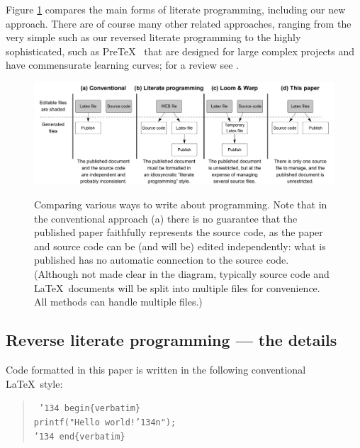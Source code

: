 \documentclass[12pt]{article}
\def\mycaption#1{\sf\bfseries\caption{\sf #1}}
\begin{document}

Figure \ref{fig:lp} compares the main forms of literate programming, including our new approach. There are of course many other related approaches, ranging from the very simple such as our reversed literate programming to the highly sophisticated, such as Pre\TeX\ \cite{pretex} that are designed for large complex projects and have commensurate learning curves; for a review see \cite{warp}.

\def\mycaption#1{\sf\bfseries\caption{\sf #1}}
\begin{figure}
\begin{center}
\includegraphics[width=.9\textwidth]{figures/literateProgramming.pdf}
\end{center}
\mycaption{Comparing various ways to write about programming. Note that in the conventional approach (a) there is no guarantee that the published paper faithfully represents the source code, as the paper and source code can be (and will be) edited independently: what is published has no automatic connection to the source code. (Although not made clear in the diagram, typically source code and \LaTeX\ documents will be split into multiple files for convenience. All methods can handle multiple files.)}
\label{fig:lp}
\end{figure}

\subsection{Reverse literate programming --- the details}

Code formatted in this paper is written in the following conventional \LaTeX\ style:

\begin{verse}\tt
\char'134 begin\{verbatim\}\\
printf("Hello world!\char'134n");\\
\char'134 end\{verbatim\}
\end{verse}
\end{document}
